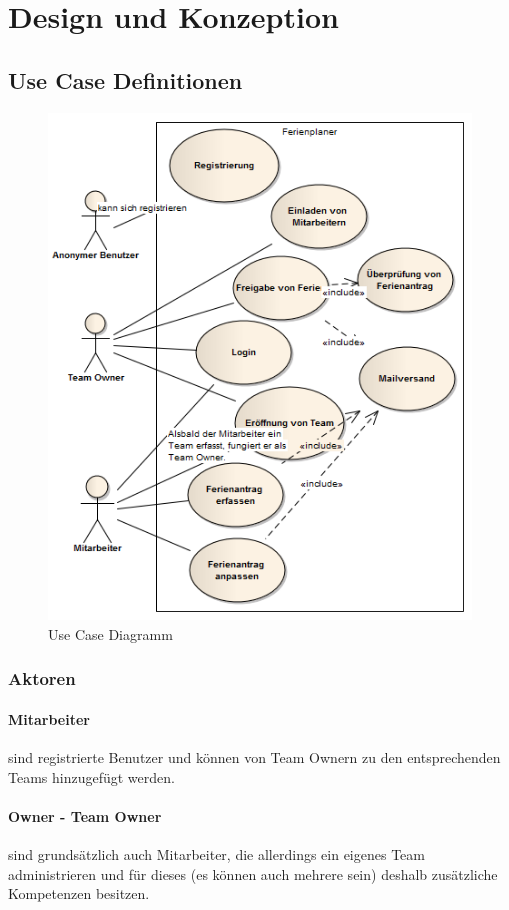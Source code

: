 \chapter{Design und Konzeption}
\section{Use Case Definitionen}\label{konzept:usecase}
 \begin{figure}[H]
  	\centering
    	\includegraphics[width=13cm]{images/usecases}
 	\caption{Use Case Diagramm}
\end{figure}
\subsection{Aktoren}
\subsubsection{Mitarbeiter} sind registrierte Benutzer und k\"onnen von Team Ownern zu den entsprechenden Teams hinzugef\"ugt werden. 
\subsubsection{Owner - Team Owner} sind grunds\"atzlich auch Mitarbeiter, die allerdings ein eigenes Team administrieren und f\"ur dieses (es k\"onnen auch mehrere sein) deshalb zus\"atzliche Kompetenzen besitzen.

